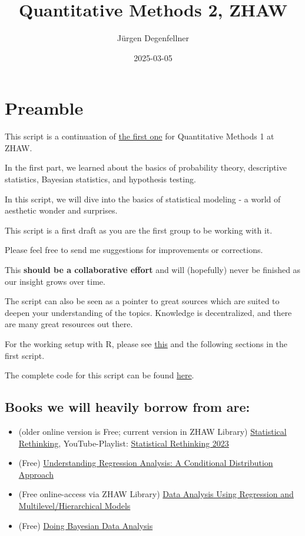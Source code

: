 \documentclass[
]{book}
\title{Quantitative Methods 2, ZHAW}
\author{Jürgen Degenfellner}
\date{2025-03-05}
\providecommand{\tightlist}{%
  \setlength{\itemsep}{0pt}\setlength{\parskip}{0pt}}
\begin{document}
\maketitle

{
\setcounter{tocdepth}{1}
\tableofcontents
}
\chapter{Preamble}\label{intro0}

This script is a continuation of
\href{https://jdegenfellner.github.io/Script_QM1_ZHAW/}{the first one} for Quantitative Methods 1
at ZHAW.

In the first part, we learned about the basics of probability theory,
descriptive statistics, Bayesian statistics, and hypothesis testing.

In this script, we will dive into the basics of statistical modeling -
a world of aesthetic wonder and surprises.

This script is a first draft as you are the first group to be working with it.

Please feel free to send me suggestions for improvements or corrections.

This \textbf{should be a collaborative effort} and will (hopefully)
never be finished as our insight grows over time.

The script can also be seen as a pointer to great sources which are
suited to deepen your understanding of the topics. Knowledge is decentralized,
and there are many great resources out there.

For the working setup with R, please
see \href{https://jdegenfellner.github.io/Script_QM1_ZHAW/index.html\#section}{this}
and the following sections in the first script.

The complete code for this script can be found
\href{https://github.com/jdegenfellner/Script_QM2_ZHAW}{here}.

\section{Books we will heavily borrow from are:}\label{books-we-will-heavily-borrow-from-are}

\begin{itemize}
\tightlist
\item
  (older online version is Free; current version in ZHAW Library) \href{https://civil.colorado.edu/~balajir/CVEN6833/bayes-resources/RM-StatRethink-Bayes.pdf}{Statistical Rethinking}, YouTube-Playlist: \href{https://youtu.be/FdnMWdICdRs?si=q2py5QVY_L299hEa}{Statistical Rethinking 2023}
\item
  (Free) \href{https://vdoc.pub/documents/understanding-regression-analysis-a-conditional-distribution-approach-84oqjr8sqva0}{Understanding Regression Analysis: A Conditional Distribution Approach}
\item
  (Free online-access via ZHAW Library) \href{http://www.stat.columbia.edu/~gelman/arm/}{Data Analysis Using Regression and Multilevel/Hierarchical Models}
\item
  (Free) \href{https://nyu-cdsc.github.io/learningr/assets/kruschke_bayesian_in_R.pdf}{Doing Bayesian Data Analysis}
\end{itemize}
\end{document}
